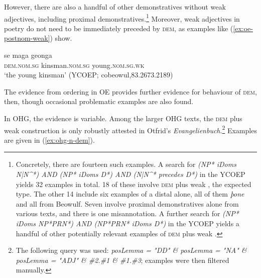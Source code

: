 \documentclass[output=paper,colorlinks,citecolor=brown]{langscibook}
\begin{document}
However, there are also a handful of other  demonstratives without weak adjectives, including proximal demonstratives.\footnote{Concretely, there are fourteen such examples. A search for \textit{(NP* iDoms N|N\^{}*) AND (NP* iDoms D*) AND (N|N\^{}* precedes D*)} in the YCOEP yields 32 examples in total. 18 of these involve \textsc{dem} plus weak , the expected type. The other 14 include six examples of a distal  alone, all of them \textit{þone} and all from Beowulf. Seven involve  proximal demonstratives alone from various texts, and there is one misannotation. A further search for \textit{(NP* iDoms NP*PRN*)  AND (NP*PRN* iDoms D*)} in the YCOEP yields a handful of other potentially relevant examples of \textsc{dem} plus weak .} Moreover,  weak adjectives in poetry do not need to be immediately preceded by \textsc{dem}, as examples like (\ref{ex:oe-postnom-weak}) show.

\begin{exe}
  \ex\gll\label{ex:oe-postnom-weak}se maga geonga\\
  \textsc{dem.nom.sg} kinsman.\textsc{nom.sg} young.\textsc{nom.sg.wk}\\
  \glt `the young kinsman' (YCOEP; cobeowul,83.2673.2189)
\end{exe}

The evidence from  ordering in OE provides further evidence for  behaviour of \textsc{dem}, then, though occasional problematic examples are also found.

In OHG, the evidence is variable. Among the larger OHG texts, the  \textsc{dem} plus weak  construction is only robustly attested in Otfrid's \emph{Evangelienbuch}.\footnote{The following query was used: \textit{posLemma = "DD" \& posLemma = "NA" \& posLemma = "ADJ" \& \#2.\#1 \& \#1.\#3}; examples were then filtered manually.} Examples are given in (\ref{ex:ohg-n-dem}).
\end{document}
